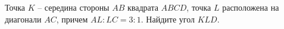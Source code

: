 \begin{ex}
	\begin{condition}
		Точка \( K \) – середина стороны \( AB  \) квадрата \( ABCD \),	точка \( L  \) расположена на диагонали \( AC \), причем \( AL : LC = 3 : 1 \). Найдите угол \( KLD \).
	\end{condition}
	\answer{\( 90\degree \)}
\end{ex}